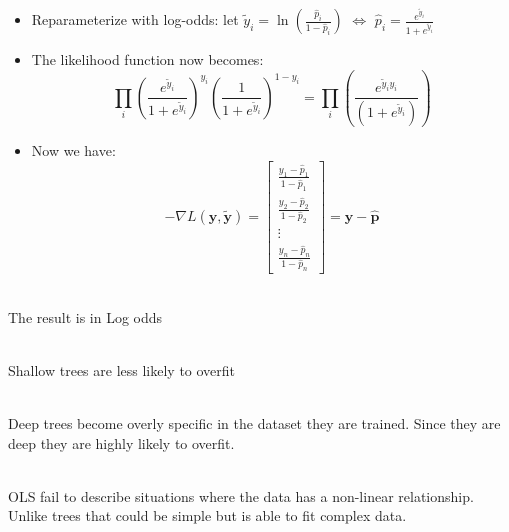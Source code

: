 \documentclass[12pt]{article}
\begin{document}
\begin{enumerate}
\begin{itemize}
\begin{itemize}
        \item Reparameterize with log-odds: let \( \tilde{y}_i = \ln \left( \frac{\hat{p}_i}{1 - \hat{p}_i} \right) \) \( \iff \) \( \hat{p}_i = \frac{e^{\tilde{y}_i}}{1 + e^{\tilde{y}_i}} \)
        
        \item The likelihood function now becomes:
        \[
        \prod_i \left( \frac{e^{\tilde{y}_i}}{1 + e^{\tilde{y}_i}} \right)^{y_i} \left( \frac{1}{1 + e^{\tilde{y}_i}} \right)^{1 - y_i} = \prod_i \left( \frac{e^{\tilde{y}_i y_i}}{(1 + e^{\tilde{y}_i})} \right)
        \]
        
        \item Now we have:
        \[
        - \nabla L(\mathbf{y}, \tilde{\mathbf{y}}) = 
        \begin{bmatrix}
            \frac{y_1 - \hat{p}_1}{1 - \hat{p}_1} \\
            \frac{y_2 - \hat{p}_2}{1 - \hat{p}_2} \\
            \vdots \\
            \frac{y_n - \hat{p}_n}{1 - \hat{p}_n}
        \end{bmatrix}
        = \mathbf{y} - \hat{\mathbf{p}}
        \]
    \end{itemize}
\end{itemize}

 \\ 
The result is in Log odds 

 \\ 
Shallow trees are less likely to overfit

 \\ 
Deep trees become overly specific in the dataset they are trained. Since they are deep they are highly likely to overfit.

 \\ 
OLS fail to describe situations where the data has a non-linear relationship. Unlike trees that could be simple but is able to fit complex data.


\end{enumerate}
\end{document}
